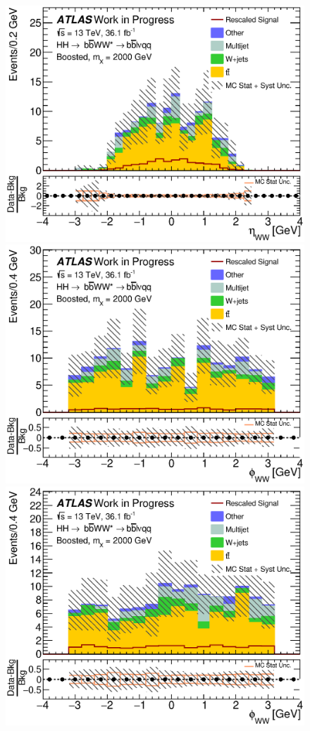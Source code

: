 \begin{figure}[h]
\begin{center}
\includegraphics[scale=0.33]{figures/kinplots/C_2tag_SR_muon_presel_met50_WWEta}\\
\includegraphics[scale=0.33]{figures/kinplots/C_2tag_SR_elec_presel_met50_WWPhi}
\includegraphics[scale=0.33]{figures/kinplots/C_2tag_SR_muon_presel_met50_WWPhi}

\end{center}
\end{figure}

